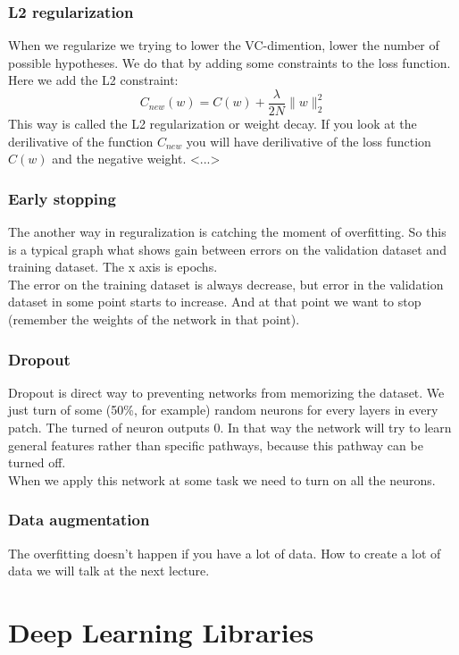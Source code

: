 \subsubsection*{L2 regularization}

When we regularize we trying to lower the VC-dimention, lower the number of possible hypotheses. We do that by adding some constraints to the loss function. Here we add the L2 constraint:
$$C_{new}(w)=C(w)+\frac{\lambda}{2N}\|w\|_2^2$$
This way is called the L2 regularization or weight decay. If you look at the derilivative of the funсtion $C_{new}$ you will have derilivative of the loss function $C(w)$ and the negative weight. <...>

\subsubsection*{Early stopping}

The another way in reguralization is catching the moment of overfitting. So this is a typical graph what shows gain between errors on the validation dataset and training dataset. The x axis is epochs.\\
The error on the training dataset is always decrease, but error in the validation dataset in some point starts to increase. And at that point we want to stop (remember the weights of the network in that point).

\subsubsection*{Dropout}

Dropout is direct way to preventing networks from memorizing the dataset. We just turn of some (50\%, for example) random neurons for every layers in every patch. The turned of neuron outputs 0. In that way the network will try to learn general features rather than specific pathways, because this pathway can be turned off.\\
When we apply this network at some task we need to turn on all the neurons.

\subsubsection*{Data augmentation}

The overfitting doesn't happen if you have a lot of data. How to create a lot of data we will talk at the next lecture.

\section{Deep Learning Libraries}

